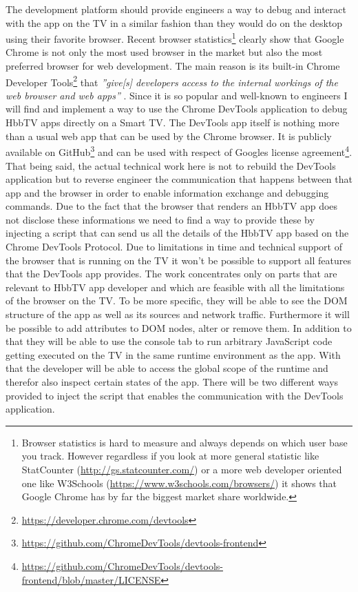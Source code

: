 The development platform should provide engineers a way to debug and interact with the app on the TV in a similar fashion than they would do on the desktop using their favorite browser. Recent browser statistics\footnote{Browser statistics is hard to measure and always depends on which user base you track. However regardless if you look at more general statistic like StatCounter (\url{http://gs.statcounter.com/}) or a more web developer oriented one like W3Schools (\url{https://www.w3schools.com/browsers/}) it shows that Google Chrome has by far the biggest market share worldwide.} clearly show that Google Chrome is not only the most used browser in the market but also the most preferred browser for web development. The main reason is its built-in Chrome Developer Tools\footnote{\url{https://developer.chrome.com/devtools}} that \textit{''give[s] developers access to the internal workings of the web browser and web apps''} \cite{devtools}. Since it is so popular and well-known to engineers I will find and implement a way to use the Chrome DevTools application to debug HbbTV apps directly on a Smart TV. The DevTools app itself is nothing more than a usual web app that can be used by the Chrome browser. It is publicly available on GitHub\footnote{\url{https://github.com/ChromeDevTools/devtools-frontend}} and can be used with respect of Googles license agreement\footnote{\url{https://github.com/ChromeDevTools/devtools-frontend/blob/master/LICENSE}}. That being said, the actual technical work here is not to rebuild the DevTools application but to reverse engineer the communication that happens between that app and the browser in order to enable information exchange and debugging commands. Due to the fact that the browser that renders an HbbTV app does not disclose these informations we need to find a way to provide these by injecting a script that can send us all the details of the HbbTV app based on the Chrome DevTools Protocol. Due to limitations in time and technical support of the browser that is running on the TV it won't be possible to support all features that the DevTools app provides. The work concentrates only on parts that are relevant to HbbTV app developer and which are feasible with all the limitations of the browser on the TV. To be more specific, they will be able to see the DOM structure of the app as well as its sources and network traffic. Furthermore it will be possible to add attributes to DOM nodes, alter or remove them. In addition to that they will be able to use the console tab to run arbitrary JavaScript code getting executed on the TV in the same runtime environment as the app. With that the developer will be able to access the global scope of the runtime and therefor also inspect certain states of the app. There will be two different ways provided to inject the script that enables the communication with the DevTools application.

